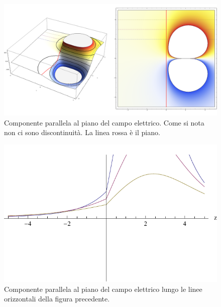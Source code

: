 \begin{Es}
\begin{figure}[htbp]
    \label{fig:campo_piano_dielettrico}
  \end{figure}
  \begin{figure}[htbp]
    \centering
    \includegraphics[scale=0.2]{immagini/fisica2/campo_due_dielettrici2}
    \caption{Componente parallela al piano del campo elettrico. Come si nota non ci sono discontinuità. La linea rossa è il piano.}
    \label{fig:campo_piano_dielettrico2}
  \end{figure}

  \begin{figure}[htbp]
    \centering
    \includegraphics{immagini/fisica2/campo_due_dielettrici4}
    \caption{Componente parallela al piano del campo elettrico lungo le linee orizzontali della figura precedente.}
    \label{fig:campo_piano_dielettrico4}
  \end{figure}


\end{Es}
